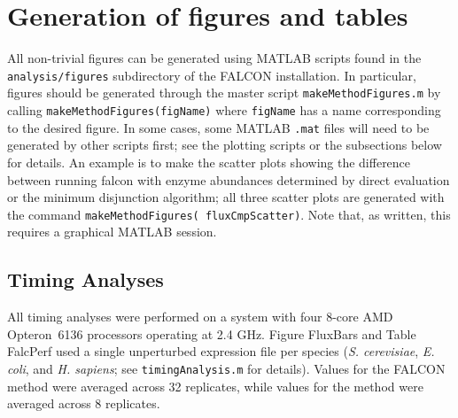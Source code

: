 \section{Generation of figures and tables}

All non-trivial figures can be generated using MATLAB scripts found in
the \texttt{analysis/figures} subdirectory of the FALCON installation.
In particular, figures should be generated through the master script
\texttt{makeMethodFigures.m} by calling
\texttt{makeMethodFigures(figName)} where \texttt{figName} has a name
corresponding to the desired figure.  In some cases, some MATLAB
\texttt{.mat} files will need to be generated by other scripts first;
see the plotting scripts or the subsections below for details. An
example is to make the scatter plots showing the difference between
running falcon with enzyme abundances determined by direct evaluation
or the minimum disjunction algorithm; all three scatter plots are
generated with the command \texttt{makeMethodFigures(\textquotesingle
fluxCmpScatter\textquotesingle)}. Note that, as written, this requires
a graphical MATLAB session.

\subsection{Timing Analyses}
All timing analyses were performed on a system with four 8-core AMD
Opteron\texttrademark\ 6136 processors operating at 2.4
GHz. Figure FluxBars and Table FalcPerf used a single
unperturbed expression file per species (\textit{S. cerevisiae},
\textit{E. coli}, and \textit{H. sapiens}; see
\texttt{timingAnalysis.m} for details). Values for the FALCON method
were averaged across 32 replicates, while values for the
\citealt{Lee2012} method were averaged across 8 replicates. 